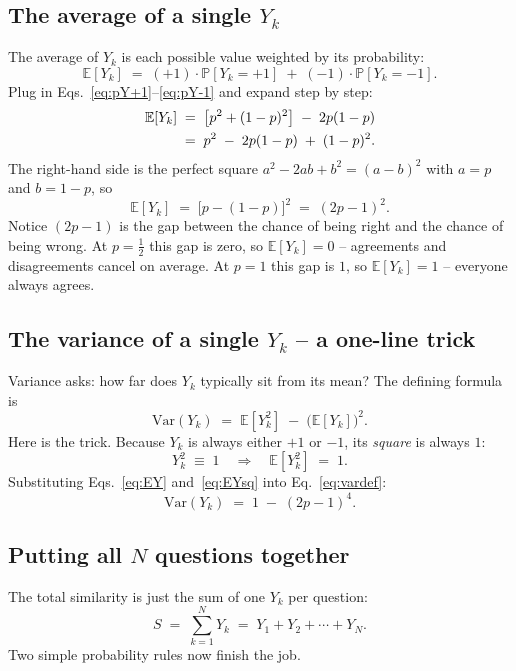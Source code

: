 \documentclass[11pt,a4paper]{article}
\newcommand{\Exp}{\mathbb{E}}
\newcommand{\Var}{\mathrm{Var}}
\renewcommand{\Pr}{\mathbb{P}}
\begin{document}
\subsection{The average of a single $Y_k$}
The average of $Y_k$ is each possible value weighted by its
probability:
\begin{equation}
  \Exp[Y_k] \;=\; (+1)\cdot\Pr[Y_k=+1] \;+\; (-1)\cdot\Pr[Y_k=-1].
\end{equation}
Plug in Eqs.~\eqref{eq:pY+1}--\eqref{eq:pY-1} and expand step by step:
\begin{align}
  \Exp[Y_k]
   &\;=\; \bigl[p^2 + (1-p)^2\bigr] \;-\; 2p(1-p) \notag\\
   &\;=\; p^2 \;-\; 2p(1-p) \;+\; (1-p)^2.
   \label{eq:EYexpand}
\end{align}
The right-hand side is the perfect square
$a^2 - 2ab + b^2 = (a-b)^2$ with $a = p$ and $b = 1-p$, so
\begin{equation}
  \boxed{\;\Exp[Y_k] \;=\; \bigl[p - (1-p)\bigr]^2 \;=\; (2p-1)^2.\;}
  \label{eq:EY}
\end{equation}
Notice $(2p-1)$ is the gap between the chance of being right and the
chance of being wrong. At $p = \tfrac12$ this gap is zero, so
$\Exp[Y_k] = 0$ -- agreements and disagreements cancel on average.
At $p = 1$ this gap is $1$, so $\Exp[Y_k] = 1$ -- everyone always
agrees.

\subsection{The variance of a single $Y_k$ -- a one-line trick}
Variance asks: how far does $Y_k$ typically sit from its mean? The
defining formula is
\begin{equation}
  \Var(Y_k) \;=\; \Exp[Y_k^2] \;-\; \bigl(\Exp[Y_k]\bigr)^2.
  \label{eq:vardef}
\end{equation}
Here is the trick. Because $Y_k$ is always either $+1$ or $-1$, its
\emph{square} is always $1$:
\begin{equation}
  Y_k^2 \;\equiv\; 1
  \quad\Longrightarrow\quad
  \Exp[Y_k^2] \;=\; 1.
  \label{eq:EYsq}
\end{equation}
Substituting Eqs.~\eqref{eq:EY} and~\eqref{eq:EYsq} into
Eq.~\eqref{eq:vardef}:
\begin{equation}
  \boxed{\;\Var(Y_k) \;=\; 1 \;-\; (2p-1)^4.\;}
  \label{eq:VarY}
\end{equation}

\subsection{Putting all $N$ questions together}
The total similarity is just the sum of one $Y_k$ per question:
\begin{equation}
  S \;=\; \sum_{k=1}^{N} Y_k \;=\; Y_1 + Y_2 + \cdots + Y_N.
  \label{eq:Ssum}
\end{equation}
Two simple probability rules now finish the job.
\end{document}
